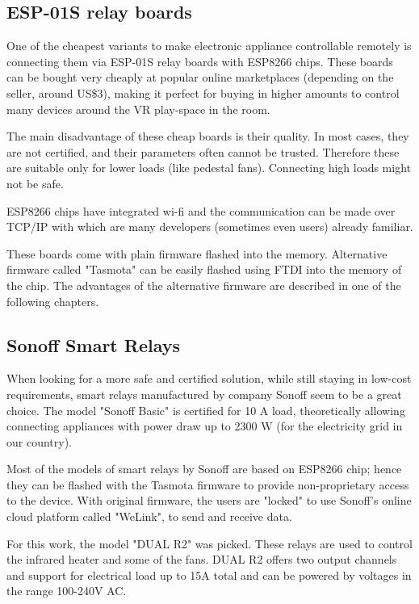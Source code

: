 \hypertarget{x-esp-01s-relay-boards}{\subsection{ESP-01S relay boards}}
One of the cheapest variants to make electronic appliance controllable
remotely is connecting them via ESP-01S relay boards with ESP8266 chips.
These boards can be bought very cheaply at popular online marketplaces
(depending on the seller, around US\$3), making it perfect for buying in
higher amounts to control many devices around the VR play-space in the room.


The main disadvantage of these cheap boards is their quality. In most cases,
they are not certified, and their parameters often cannot be trusted. Therefore
these are suitable only for lower loads (like pedestal fans). Connecting high
loads might not be safe.


ESP8266 chips have integrated wi-fi and the communication can be made over
TCP/IP with which are many developers (sometimes even users) already familiar.


These boards come with plain firmware flashed into the memory. Alternative
firmware called "Tasmota" can be easily flashed using FTDI into the memory
of the chip. The advantages of the alternative firmware are described
in one of the following chapters.


\hypertarget{x-sonoff-smart-relays}{\subsection{Sonoff Smart Relays}}
When looking for a more safe and certified solution, while still staying in
low-cost requirements, smart relays manufactured by company Sonoff
seem to be a great choice. The model "Sonoff Basic" is certified for 10 A load,
theoretically allowing connecting appliances with power draw up to 2300 W (for the
electricity grid in our country).


Most of the models of smart relays by Sonoff are based on ESP8266 chip;
hence they can be flashed with the Tasmota firmware to provide non-proprietary
access to the device. With original firmware, the users are "locked" to use
Sonoff’s online cloud platform called "WeLink", to send and receive data.


For this work, the model "DUAL R2" was picked. These relays are used to
control the infrared heater and some of the fans. DUAL R2 offers two output
channels and support for electrical load up to 15A total and can be powered
by voltages in the range 100-240V AC.


